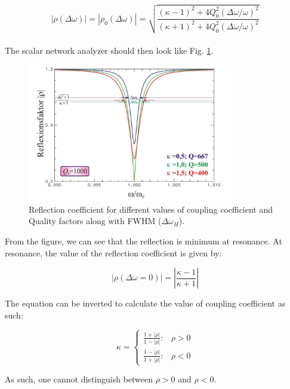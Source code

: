 \documentclass[a4paper]{report}
\numberwithin{equation}{section}
\begin{document}
\begin{equation} \label{eqn:scalar}
			\left| \rho (\Delta \omega) \right| = \left| \rho_{0}(\Delta \omega) \right| = \sqrt{\frac{(\kappa - 1)^2 + 4Q_{0}^2 \left(\Delta \omega / \omega \right)^2}{(\kappa + 1)^2 + 4Q_{0}^2 \left(\Delta \omega / \omega \right)^2}} 
\end{equation}
\\
The scalar network analyzer should then look like Fig. \ref{fig:scalar}.

\begin{figure}[hbt!]
    \centering
    \includegraphics[width=0.8\textwidth]{scalar}
	\caption{Reflection coefficient for different values of coupling coefficient and Quality factors along with FWHM ($\Delta \omega_{H}$). \cite{Hillert}}
    \label{fig:scalar}
\end{figure}

From the figure, we can see that the reflection is minimum at resonance. At resonance, the value of the reflection coefficient is given by:

\begin{equation}
		\left| \rho (\Delta \omega = 0) \right| = \left| \frac{\kappa - 1}{\kappa +1} \right| 
\end{equation}

The equation can be inverted to calculate the value of coupling coefficient as
such:

\begin{equation}
	\kappa = 
	\begin{cases}
		\frac{1 + |\rho|}{1 - |\rho|} :& \rho > 0\\
		\frac{1 - |\rho|}{1 + |\rho|} :& \rho < 0
	\end{cases}
	\label{eqn:kappa_rho}
\end{equation}

As such, one cannot distinguish between $\rho >0$ and $\rho<0$. 
\end{document}
